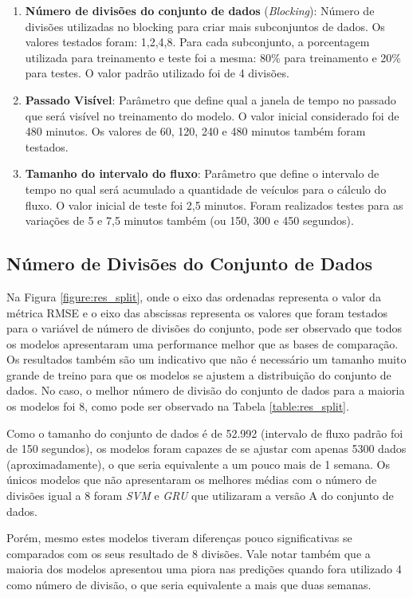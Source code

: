 \begin{enumerate}
	\item \textbf{Número de divisões do conjunto de dados} (\textit{Blocking}): Número de divisões utilizadas no blocking para criar mais subconjuntos de dados. Os valores testados foram: 1,2,4,8. Para cada subconjunto, a porcentagem utilizada para treinamento e teste foi a mesma: 80\% para treinamento e 20\% para testes. O valor padrão utilizado foi de 4 divisões.
	\item \textbf{Passado Visível}: Parâmetro que define qual a janela de tempo no passado que será visível no treinamento do modelo. O valor inicial considerado foi de 480 minutos. Os valores de 60, 120, 240 e 480 minutos também foram testados.
	\item \textbf{Tamanho do intervalo do fluxo}: Parâmetro que define o intervalo de tempo no qual será acumulado a quantidade de veículos para o cálculo do fluxo. O valor inicial de teste foi 2,5 minutos. Foram realizados testes para as variações de 5 e 7,5 minutos também (ou 150, 300 e 450 segundos).
\end{enumerate}

\subsection{Número de Divisões do Conjunto de Dados}

Na Figura \ref{figure:res_split}, onde o eixo das ordenadas representa o valor da métrica \acrshort{RMSE} e o eixo das abscissas representa os valores que foram testados para o variável de número de divisões do conjunto,  pode ser observado que todos os modelos apresentaram uma performance melhor que as bases de comparação. Os resultados também são um indicativo que não é necessário um tamanho muito grande de treino para que os modelos se ajustem a distribuição do conjunto de dados. No caso, o melhor número de divisão do conjunto de dados para a maioria os modelos foi  8, como pode ser observado na Tabela \ref{table:res_split}. 

Como o tamanho do conjunto de dados é de 52.992 (intervalo de fluxo padrão foi de 150 segundos), os modelos foram capazes de se ajustar com apenas 5300 dados (aproximadamente), o que seria equivalente a um pouco mais de 1 semana. Os únicos modelos que não apresentaram os melhores médias com o número de divisões igual a 8 foram \textit{\acrshort{SVM}} e \textit{\acrshort{GRU}} que utilizaram a versão A do conjunto de dados. 

Porém, mesmo estes modelos tiveram diferenças pouco significativas se comparados com os seus resultado de 8 divisões. Vale notar também que a maioria dos modelos apresentou uma piora nas predições quando fora utilizado 4 como número de divisão, o que seria equivalente a mais que duas semanas.

